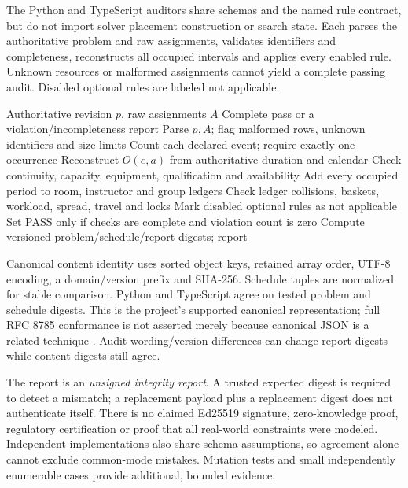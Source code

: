 \documentclass[pdflatex,sn-mathphys-num]{sn-jnl}
\theoremstyle{thmstyleone}
\theoremstyle{thmstyletwo}
\theoremstyle{thmstylethree}
\begin{document}
The Python and TypeScript auditors share schemas and the named rule contract, but do not import solver placement construction or search state. Each parses the authoritative problem and raw assignments, validates identifiers and completeness, reconstructs all occupied intervals and applies every enabled rule. Unknown resources or malformed assignments cannot yield a complete passing audit. Disabled optional rules are labeled not applicable.

\begin{algorithm}[t]
\caption{Independent occupancy reconstruction}\label{alg:audit}
\begin{algorithmic}[1]
\Require Authoritative revision $p$, raw assignments $A$
\Ensure Complete pass or a violation/incompleteness report
\State Parse $p,A$; flag malformed rows, unknown identifiers and size limits
\State Count each declared event; require exactly one occurrence
 \State Reconstruct $O(e,a)$ from authoritative duration and calendar
 \State Check continuity, capacity, equipment, qualification and availability
 \State Add every occupied period to room, instructor and group ledgers
\EndFor
\State Check ledger collisions, baskets, workload, spread, travel and locks
\State Mark disabled optional rules as not applicable
\State Set PASS only if checks are complete and violation count is zero
\State Compute versioned problem/schedule/report digests; \Return report
\end{algorithmic}
\end{algorithm}

Canonical content identity uses sorted object keys, retained array order, UTF-8 encoding, a domain/version prefix and SHA-256. Schedule tuples are normalized for stable comparison. Python and TypeScript agree on tested problem and schedule digests. This is the project's supported canonical representation; full RFC 8785 conformance is not asserted merely because canonical JSON is a related technique \cite{D15}. Audit wording/version differences can change report digests while content digests still agree.

The report is an \emph{unsigned integrity report}. A trusted expected digest is required to detect a mismatch; a replacement payload plus a replacement digest does not authenticate itself. There is no claimed Ed25519 signature, zero-knowledge proof, regulatory certification or proof that all real-world constraints were modeled. Independent implementations also share schema assumptions, so agreement alone cannot exclude common-mode mistakes. Mutation tests and small independently enumerable cases provide additional, bounded evidence.
\end{document}
